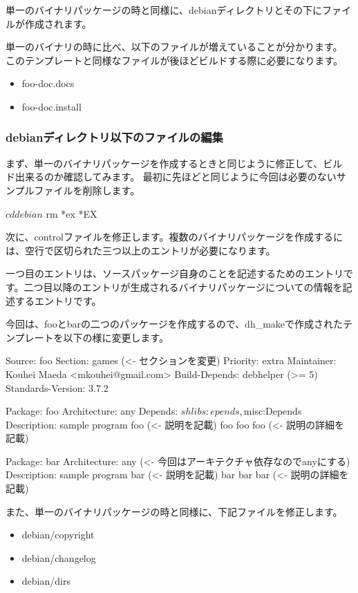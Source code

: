 \documentclass[mingoth,a4paper]{jsarticle}
\begin{document}
単一のバイナリパッケージの時と同様に、debianディレクトリとその下にファイ
ルが作成されます。

単一のバイナリの時に比べ、以下のファイルが増えていることが分かります。
このテンプレートと同様なファイルが後ほどビルドする際に必要になります。
\begin{itemize}
 \item
      foo-doc.docs
 \item
      foo-doc.install
\end{itemize}

\subsubsection{debianディレクトリ以下のファイルの編集}
まず、単一のバイナリパッケージを作成するときと同じように修正して、ビル
ド出来るのか確認してみます。
最初に先ほどと同じように今回は必要のないサンプルファイルを削除します。

\begin{commandline}
$ cd debian
$ rm *ex *EX
\end{commandline}

次に、controlファイルを修正します。複数のバイナリパッケージを作成するに
は、空行で区切られた三つ以上のエントリが必要になります。

一つ目のエントリは、ソースパッケージ自身のことを記述するためのエントリで
す。二つ目以降のエントリが生成されるバイナリパッケージについての情報を記
述するエントリです。

今回は、fooとbarの二つのパッケージを作成するので、dh\_makeで作成されたテ
ンプレートを以下の様に変更します。

\begin{commandline}
Source: foo
Section: games (<- セクションを変更)
Priority: extra
Maintainer: Kouhei Maeda <mkouhei@gmail.com>
Build-Depends: debhelper (>= 5)
Standards-Version: 3.7.2

Package: foo
Architecture: any
Depends: ${shlibs:epends}, ${misc:Depends}
Description: sample program foo (<- 説明を記載)
 foo foo foo (<- 説明の詳細を記載)

Package: bar
Architecture: any (<- 今回はアーキテクチャ依存なのでanyにする)
Description: sample program bar (<- 説明を記載)
 bar bar bar (<- 説明の詳細を記載)
\end{commandline}

また、単一のバイナリパッケージの時と同様に、下記ファイルを修正します。
\begin{itemize}
 \item
      debian/copyright
 \item
      debian/changelog
 \item
      debian/dirs
\end{itemize}
\end{document}
